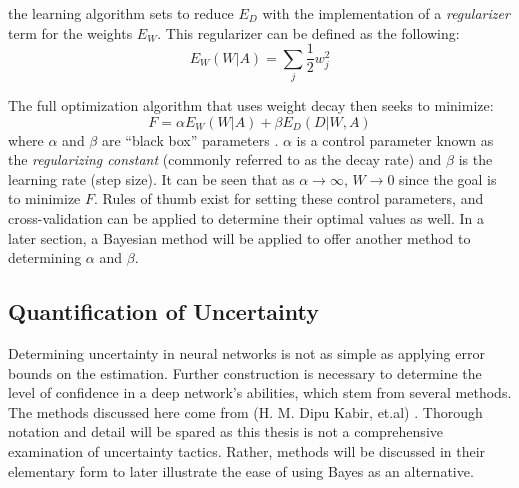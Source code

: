 the learning algorithm sets to reduce $E_D$ with the implementation of a \textit{regularizer} term for the weights $E_W$.  This regularizer can be defined as the following:
$$
E_W(W|A) = \sum_j \frac{1}{2} w_j^2
$$

The full optimization algorithm that uses weight decay then seeks to minimize:
$$
F = \alpha E_W(W|A) + \beta E_D(D|W,A)
$$
where $\alpha$ and $\beta$ are ``black box'' parameters \cite{mackay1992practical}.  $\alpha$ is a control parameter known as the \textit{regularizing constant} (commonly referred to as the decay rate) and $\beta$ is the learning rate (step size).  It can be seen that as $\alpha \rightarrow \infty$, $W \rightarrow 0$ since the goal is to minimize $F$.  Rules of thumb exist for setting these control parameters, and cross-validation can be applied to determine their optimal values as well.  In a later section, a Bayesian method will be applied to offer another method to determining $\alpha$ and $\beta$.

\subsection{Quantification of Uncertainty}

Determining uncertainty in neural networks is not as simple as applying error bounds on the estimation.  Further construction is necessary to determine the level of confidence in a deep network's abilities, which stem from several methods.  The methods discussed here come from (H. M. Dipu Kabir, et.al) \cite{8371683}.  Thorough notation and detail will be spared as this thesis is not a comprehensive examination of uncertainty tactics.  Rather, methods will be discussed in their elementary form to later illustrate the ease of using Bayes as an alternative.

